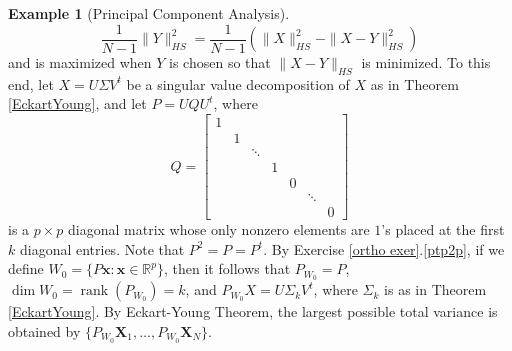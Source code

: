 \documentclass[12pt,letterpaper]{book}
\numberwithin{equation}{section}
\theoremstyle{definition}
\newtheorem{example}[thm]{\textbf{Example}}
\newcommand{\vx}{\bm{x}}
\newcommand{\rank}{\operatorname{rank}}
\begin{document}
\begin{example}[Principal Component Analysis]
\begin{equation}\label{total relation}\frac{1}{N-1}\|Y\|^2_{HS}=\frac{1}{N-1}\left(\|X\|^2_{HS}-\|X-Y\|^2_{HS}\right)\end{equation} and is maximized when $Y$ is chosen so that $\|X-Y\|_{HS}$ is minimized. To this end, let $X=U\Sigma V^t$ be a singular value decomposition of $X$ as in Theorem \ref{EckartYoung}, and let $P=UQ U^t$, where
$$Q=\left[\begin{array}{ccccccc} 1 &&&&&&  \\ & 1 &&&&& \\ && \ddots &&&& \\ &&& 1 &&& \\ &&&& 0 && \\ &&&&& \ddots & \\ &&&&&& 0 \end{array}\right]$$
is a $p\times p$ diagonal matrix whose only nonzero elements are $1$'s placed at the first $k$ diagonal entries. Note that $P^2=P=P^t$. By Exercise \ref{ortho exer}.\ref{ptp2p}, if we define $W_0=\{P\vx:\vx\in \mathbb{R}^p\}$, then it follows that $P_{W_0}=P$, $\dim W_0=\rank(P_{W_0})=k$, and $P_{W_0}X=U\Sigma_kV^t$, where $\Sigma_k$ is as in Theorem \ref{EckartYoung}. By Eckart-Young Theorem, the largest possible total variance is obtained by $\{P_{W_0}\bm{X}_1,\ldots,P_{W_0}\bm{X}_N\}$.
\end{example}
\end{document}
